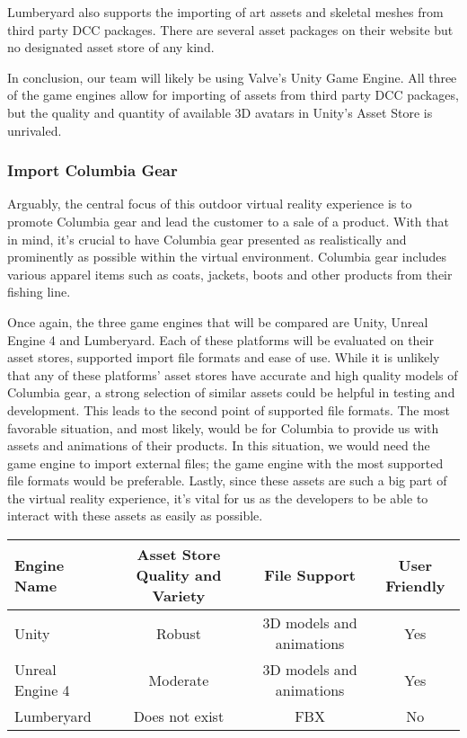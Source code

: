 \documentclass[10pt,journal,compsoc,onecolumn, draftclsnofoot]{IEEEtran}
\begin{document}
\begin{bibunit}
Lumberyard also supports the importing of art assets and skeletal meshes from third party DCC packages\cite{lumberyard_character}. There are several asset packages on their website but no designated asset store of any kind.

In conclusion, our team will likely be using Valve's Unity Game Engine. All three of the game engines allow for importing of assets from third party DCC packages, but the quality and quantity of available 3D avatars in Unity's Asset Store is unrivaled.

\subsubsection{Import Columbia Gear}
Arguably, the central focus of this outdoor virtual reality experience is to promote Columbia gear and lead the customer to a sale of a product. With that in mind, it's crucial to have Columbia gear presented as realistically and prominently as possible within the virtual environment. Columbia gear includes various apparel items such as coats, jackets, boots and other products from their fishing line.

Once again, the three game engines that will be compared are Unity, Unreal Engine 4 and Lumberyard. Each of these platforms will be evaluated on their asset stores, supported import file formats and ease of use. While it is unlikely that any of these platforms' asset stores have accurate and high quality models of Columbia gear, a strong selection of similar assets could be helpful in testing and development. This leads to the second point of supported file formats. The most favorable situation, and most likely, would be for Columbia to provide us with assets and animations of their products. In this situation, we would need the game engine to import external files; the game engine with the most supported file formats would be preferable. Lastly, since these assets are such a big part of the virtual reality experience, it's vital for us as the developers to be able to interact with these assets as easily as possible.

\vspace{2mm}
\begin{table}[h!]
\centering
  \begin{tabular}{ | l || c | c | c | }
  \hline
  Engine Name & Asset Store Quality and Variety & File Support & User Friendly\\
  \hline
  Unity & Robust & 3D models and animations & Yes\\ \hline
  Unreal Engine 4 & Moderate & 3D models and animations & Yes\\ \hline
  Lumberyard & Does not exist & FBX & No\\ \hline
  \end{tabular}
\end{table}
\vspace{2mm}


\end{bibunit}
\end{document}
